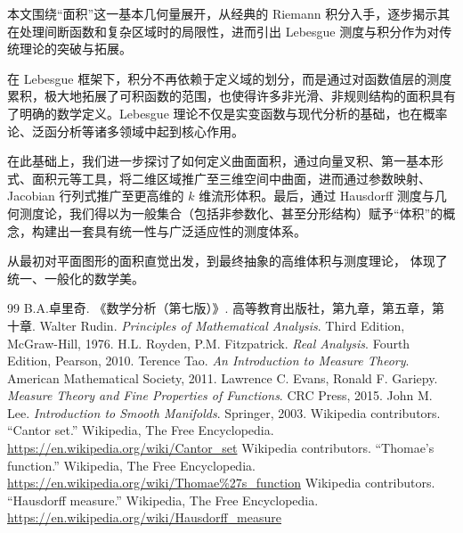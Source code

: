 \documentclass[a4paper, oneside]{article}
\begin{document}
本文围绕“面积”这一基本几何量展开，从经典的 Riemann 积分入手，逐步揭示其在处理间断函数和复杂区域时的局限性，进而引出 Lebesgue 测度与积分作为对传统理论的突破与拓展。

在 Lebesgue 框架下，积分不再依赖于定义域的划分，而是通过对函数值层的测度累积，极大地拓展了可积函数的范围，也使得许多非光滑、非规则结构的面积具有了明确的数学定义。Lebesgue 理论不仅是实变函数与现代分析的基础，也在概率论、泛函分析等诸多领域中起到核心作用。

在此基础上，我们进一步探讨了如何定义曲面面积，通过向量叉积、第一基本形式、面积元等工具，将二维区域推广至三维空间中曲面，进而通过参数映射、Jacobian 行列式推广至更高维的 $k$ 维流形体积。最后，通过 Hausdorff 测度与几何测度论，我们得以为一般集合（包括非参数化、甚至分形结构）赋予“体积”的概念，构建出一套具有统一性与广泛适应性的测度体系。

从最初对平面图形的面积直觉出发，到最终抽象的高维体积与测度理论， 体现了统一、一般化的数学美。


\begin{thebibliography}{99} 
     B.A.卓里奇. 《数学分析（第七版）》. 高等教育出版社，第九章，第五章，第十章.
     Walter Rudin. \emph{Principles of Mathematical Analysis}. Third Edition, McGraw-Hill, 1976.
     H.L. Royden, P.M. Fitzpatrick. \emph{Real Analysis}. Fourth Edition, Pearson, 2010.
     Terence Tao. \emph{An Introduction to Measure Theory}. American Mathematical Society, 2011.
     Lawrence C. Evans, Ronald F. Gariepy. \emph{Measure Theory and Fine Properties of Functions}. CRC Press, 2015.
     John M. Lee. \emph{Introduction to Smooth Manifolds}. Springer, 2003.
     Wikipedia contributors. “Cantor set.” Wikipedia, The Free Encyclopedia. \url{https://en.wikipedia.org/wiki/Cantor_set}
     Wikipedia contributors. “Thomae's function.” Wikipedia, The Free Encyclopedia. \url{https://en.wikipedia.org/wiki/Thomae%27s_function}
     Wikipedia contributors. “Hausdorff measure.” Wikipedia, The Free Encyclopedia. \url{https://en.wikipedia.org/wiki/Hausdorff_measure}
\end{thebibliography}
\end{document}
